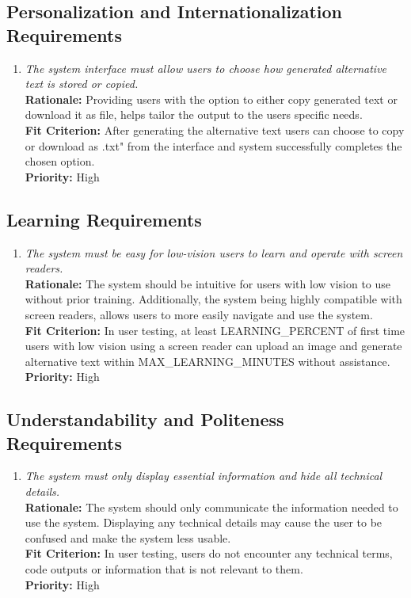 \documentclass[12pt]{article}
\begin{document}
\subsection{Personalization and Internationalization Requirements}
\begin{enumerate}[label=UHR-PIR \arabic*., wide=0pt, leftmargin=*]
\item \emph{The system interface must allow users to choose how generated alternative text is stored or copied.}\\[2mm] 
    {\bf Rationale:} Providing users with the option to either copy generated text or download it as file, helps tailor the output to the users specific needs.  \\
    {\bf Fit Criterion:} After generating the alternative text users can choose to copy or download as .txt" from the interface and system successfully completes the chosen option.\\
    {\bf Priority:} High
\end{enumerate}

\subsection{Learning Requirements}
\begin{enumerate}[label=UHR-LR \arabic*., wide=0pt, leftmargin=*]
\item \emph{The system must be easy for low-vision users to learn and operate with screen readers.}\\[2mm] 
    {\bf Rationale:} The system should be intuitive for users with low vision to use without prior training. Additionally, the system being highly compatible with screen readers, allows users to more easily navigate and use the system.  \\
    {\bf Fit Criterion:} In user testing, at least LEARNING\_PERCENT of first time users with low vision using a screen reader can upload an image and generate alternative text within MAX\_LEARNING\_MINUTES without assistance. \\
    {\bf Priority:} High
\end{enumerate}

\subsection{Understandability and Politeness Requirements}
\begin{enumerate}[label=UHR-LR \arabic*., wide=0pt, leftmargin=*]
  \item \emph{The system must only display essential information and
    hide all technical details.}\\[2mm]
    {\bf Rationale:} The system should only communicate the
    information needed to use the system. Displaying any technical
    details may cause the user to be confused and make the system
    less usable.   \\
    {\bf Fit Criterion:} In user testing, users do not encounter any
    technical terms, code outputs or information that is not relevant
    to them.  \\
    {\bf Priority:} High
\end{enumerate}
\end{document}
